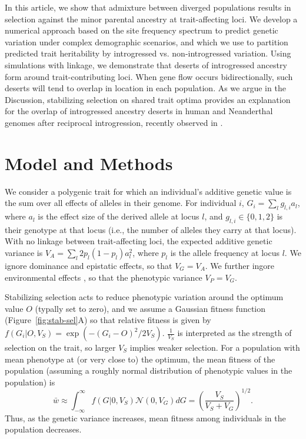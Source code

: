 \documentclass{article}
\begin{document}
In this article, we show that admixture between diverged populations results in
selection against the minor parental ancestry at trait-affecting loci. We
develop a numerical approach based on the site frequency spectrum to predict
genetic variation under complex demographic scenarios, and which we use to
partition predicted trait heritability by introgressed vs. non-introgressed
variation. Using simulations with linkage, we demonstrate that deserts of
introgressed ancestry form around trait-contributing loci. When gene flow
occurs bidirectionally, such deserts will tend to overlap in location in each
population. As we argue in the Discussion, stabilizing selection on shared
trait optima provides an explanation for the overlap of introgressed ancestry
deserts in human and Neanderthal genomes after reciprocal introgression,
recently observed in \citet{harris2023diverse}.

\section*{Model and Methods}

We consider a polygenic trait for which an individual's additive genetic value
is the sum over all effects of alleles in their genome. For individual $i$,
\(G_i = \sum_l g_{l, i} a_l\), where $a_l$ is the effect size of the derived
allele at locus $l$, and \(g_{l,i}\in\{0,1,2\}\) is their genotype at that
locus (i.e., the number of alleles they carry at that locus). With no linkage
between trait-affecting loci, the expected additive genetic variance is \(V_A =
\sum_l 2p_l(1-p_l)a_l^2\), where $p_l$ is the allele frequency at locus $l$. We
ignore dominance and epistatic effects, so that \(V_G = V_A\). We further
ingore environmental effects \citep{simons2018population}, so that the
phenotypic variance \(V_P=V_G\).

Stabilizing selection acts to reduce phenotypic variation around the optimum
value $O$ (typally set to zero), and we assume a Gaussian fitness function
(Figure~\ref{fig:stab-sel}A) so that relative fitness is given by \(f(G_i | O,
V_S) = \exp{(-(G_i - O)^2 / 2 V_S)}\). $\frac{1}{V_S}$ is interpreted as the
strength of selection on the trait, so larger $V_S$ implies weaker selection.
For a population with mean phenotype at (or very close to) the optimum, the
mean fitness of the population (assuming a roughly normal distribution of
phenotypic values in the population) is
\[\bar{w} \approx \int_{-\infty}^\infty
f(G | 0, V_S) \mathcal{N}(0, V_G) dG =
\left(\frac{V_S}{V_S+V_G}\right)^{1/2}.\]
Thus, as the genetic variance increases, mean fitness among individuals in the
population decreases.
\end{document}
